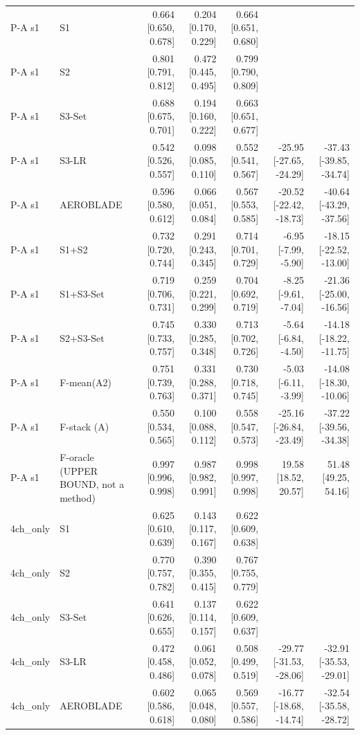 \begin{table}[htbp]
\begin{tabular}{llrrrrr}
P-A s1 & S1 & 0.664 [0.650, 0.678] & 0.204 [0.170, 0.229] & 0.664 [0.651, 0.680] &  &  \\
P-A s1 & S2 & 0.801 [0.791, 0.812] & 0.472 [0.445, 0.495] & 0.799 [0.790, 0.809] &  &  \\
P-A s1 & S3-Set & 0.688 [0.675, 0.701] & 0.194 [0.160, 0.222] & 0.663 [0.651, 0.677] &  &  \\
P-A s1 & S3-LR & 0.542 [0.526, 0.557] & 0.098 [0.085, 0.110] & 0.552 [0.541, 0.567] & -25.95 [-27.65, -24.29] & -37.43 [-39.85, -34.74] \\
P-A s1 & AEROBLADE & 0.596 [0.580, 0.612] & 0.066 [0.051, 0.084] & 0.567 [0.553, 0.585] & -20.52 [-22.42, -18.73] & -40.64 [-43.29, -37.56] \\
P-A s1 & S1+S2 & 0.732 [0.720, 0.744] & 0.291 [0.243, 0.345] & 0.714 [0.701, 0.729] & -6.95 [-7.99, -5.90] & -18.15 [-22.52, -13.00] \\
P-A s1 & S1+S3-Set & 0.719 [0.706, 0.731] & 0.259 [0.221, 0.299] & 0.704 [0.692, 0.719] & -8.25 [-9.61, -7.04] & -21.36 [-25.00, -16.56] \\
P-A s1 & S2+S3-Set & 0.745 [0.733, 0.757] & 0.330 [0.285, 0.348] & 0.713 [0.702, 0.726] & -5.64 [-6.84, -4.50] & -14.18 [-18.22, -11.75] \\
P-A s1 & F-mean(A2) & 0.751 [0.739, 0.763] & 0.331 [0.288, 0.371] & 0.730 [0.718, 0.745] & -5.03 [-6.11, -3.99] & -14.08 [-18.30, -10.06] \\
P-A s1 & F-stack (A) & 0.550 [0.534, 0.565] & 0.100 [0.088, 0.112] & 0.558 [0.547, 0.573] & -25.16 [-26.84, -23.49] & -37.22 [-39.56, -34.38] \\
P-A s1 & F-oracle (UPPER BOUND, not a method) & 0.997 [0.996, 0.998] & 0.987 [0.982, 0.991] & 0.998 [0.997, 0.998] & 19.58 [18.52, 20.57] & 51.48 [49.25, 54.16] \\
4ch\_only & S1 & 0.625 [0.610, 0.639] & 0.143 [0.117, 0.167] & 0.622 [0.609, 0.638] &  &  \\
4ch\_only & S2 & 0.770 [0.757, 0.782] & 0.390 [0.355, 0.415] & 0.767 [0.755, 0.779] &  &  \\
4ch\_only & S3-Set & 0.641 [0.626, 0.655] & 0.137 [0.114, 0.157] & 0.622 [0.609, 0.637] &  &  \\
4ch\_only & S3-LR & 0.472 [0.458, 0.486] & 0.061 [0.052, 0.078] & 0.508 [0.499, 0.519] & -29.77 [-31.53, -28.06] & -32.91 [-35.53, -29.01] \\
4ch\_only & AEROBLADE & 0.602 [0.586, 0.618] & 0.065 [0.048, 0.080] & 0.569 [0.557, 0.586] & -16.77 [-18.68, -14.74] & -32.54 [-35.58, -28.72] \\

\end{tabular}
\end{table}
